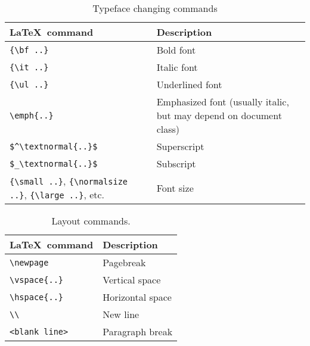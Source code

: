 \documentclass{article}
\begin{document}
\begin{table}[htbp]
\caption{Typeface changing commands}
\begin{tabularx}{\textwidth}{lX}
\toprule
\LaTeX~command & Description \\
\midrule
\verb|{\bf ..}| & Bold font\\
\verb|{\it ..}| & Italic font\\
\verb|{\ul ..}| & Underlined font\\
\verb|\emph|\verb|{..}| & Emphasized font (usually italic, but may depend on document class)\\
\verb|$^\textnormal|\verb|{..}$| & Superscript \\
\verb|$_\textnormal|\verb|{..}$| & Subscript \\
\verb|{\small ..}|, \verb|{\normalsize ..}|, \verb|{\large ..}|, etc. & Font size\\
\bottomrule
\end{tabularx}
\end{table}


\begin{table}[htbp]
\caption{Layout commands.}
\begin{tabularx}{\textwidth}{ll}
\toprule
\LaTeX~command & Description \\
\midrule
\verb|\newpage| & Pagebreak\\
\verb|\vspace|\verb|{..}| & Vertical space\\
\verb|\hspace|\verb|{..}| & Horizontal space\\
\verb|\\| & New line\\
\verb|<blank line>| & Paragraph break \\
\bottomrule
\end{tabularx}
\end{table}
\end{document}
